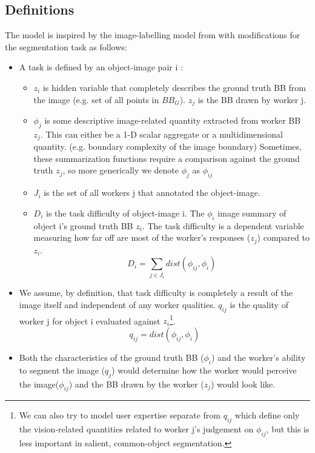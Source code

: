 \documentclass[12pt]{article}
\begin{document}
\subsection{Definitions}
The model is inspired by the image-labelling model from \cite{MDWWelinder2010} with modifications for the segmentation task as follows:
\begin{itemize}
\item A task is defined by an object-image pair i : 
\begin{itemize}
\item $z_i$ is hidden variable that completely describes the ground truth BB from the image (e.g. set of all points in $BB_G$). $z_j$ is the BB drawn by worker j.
\item  $\phi_j$ is some descriptive image-related quantity extracted from worker BB $z_j$. This can either be a 1-D scalar aggregate or a multidimensional quantity. (e.g. boundary complexity of the image boundary) Sometimes, these summarization functions require a comparison against the ground truth $z_j$, so more generically we denote $\phi_j$ as $\phi_{ij}$
\item $J_i$ is the set of all workers j that annotated the object-image. 
\item $D_i$ is the task difficulty of object-image i. The $\phi_i$ image summary  of object i's ground truth BB $z_i$. The task difficulty is a dependent variable measuring how far off are most of the worker's responses ($z_j$) compared to $z_i$.  
\begin{equation}
D_i = \sum_{j\in J_i} dist(\phi_{ij},\phi_i)
\label{task_difficulty}
\end{equation}
\end{itemize}
\item We assume, by definition, that task difficulty is completely a result of the image itself and independent of any worker qualities. $q_{ij}$ is the quality of worker j for object i evaluated against $z_i$\footnote{We can also try to model user expertise separate from $q_{ij}$ which define only the vision-related quantities related to worker j's judgement on $\phi_{ij}$, but this is less important in salient, common-object segmentation.}.
\begin{equation}
q_{ij} = dist(\phi_{ij},\phi_i)
\label{worker_quality}
\end{equation}
\item Both the characteristics of the ground truth BB ($\phi_i$) and the worker's ability to segment the image ($q_j$) would determine how the worker would perceive the image($\phi_{ij}$) and the BB drawn by the worker ($z_{j}$) would look like.
\end{itemize}
\end{document}
